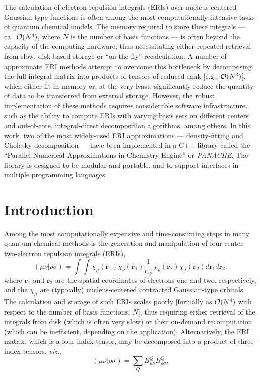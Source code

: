 \documentclass[12pt,letterpaper]{article}
\renewcommand{\vec}[1]{\ensuremath{\bm{#1}}\xspace}
\newcommand{\panache}{\textit{PANACHE}\xspace}
\begin{document}
The calculation of electron repulsion integrals (ERIs) over nucleus-centered
Gaussian-type functions is often among the most computationally intensive
tasks of quantum chemical models.  The memory required to store these
integrals --- ca.\ ${\cal O}(N^4)$, where $N$ is the number of basis functions
--- is often beyond the capacity of the computing hardware, thus necessitating
either repeated retrieval from slow, disk-based storage or ``on-the-fly''
recalculation.  A number of approximate ERI methods attempt to overcome this
bottleneck by decomposing the full integral matrix into products of tensors of
reduced rank [e.g., ${\cal O}(N^3)$], which either fit in memory or, at the
very least, significantly reduce the quantity of data to be transferred from
external storage.  However, the robust implementation of these methods
requires considerable software infrastructure, such as the ability to compute
ERIs with varying basis sets on different centers and out-of-core,
integral-direct decomposition algorithms, among others.  In this work, two of
the most widely-used ERI approximations --- density-fitting and Cholesky
decomposition --- have been implemented in a C++ library called the ``Parallel
Numerical Approximations in Chemistry Engine'' or \panache. The library is
designed to be modular and portable, and to support interfaces in multiple
programming languages.

\clearpage


\section{Introduction}
\label{sec:intro} 

Among the most computationally expensive and time-consuming steps in many
quantum chemical methods is the generation and manipulation of four-center
two-electron repulsion integrals (ERIs),
\begin{equation}
(\mu \nu | \rho \sigma) = \int \int \chi_\mu(\vec{r}_1) \chi_\nu(\vec{r}_1)
\frac{1}{r_{12}} \chi_\rho(\vec{r}_2) \chi_\sigma(\vec{r}_2)
d\vec{r}_1 d\vec{r}_2,
\end{equation}
where $\vec{r}_1$ and $\vec{r}_2$ are the spatial coordinates of electrons one
and two, respectively, and the $\chi_\mu$ are (typically) nucleus-centered
contracted Gaussian-type orbitals.  The calculation and storage of such ERIs
scales poorly [formally as ${\cal O}(N^4)$ with respect to the number of basis
functions, $N$], thus requiring either retrieval of the integrals from disk
(which is often very slow) or their on-demand recomputation (which can be
inefficient, depending on the application).  Alternatively, the ERI matrix,
which is a four-index tensor, may be decomposed into a product of three-index
tensors, {\em viz.},
\begin{equation}
(\mu \nu | \rho \sigma) = \sum_{Q} B_{\mu \nu}^Q B_{\rho \sigma}^Q,
\end{equation}
\end{document}
